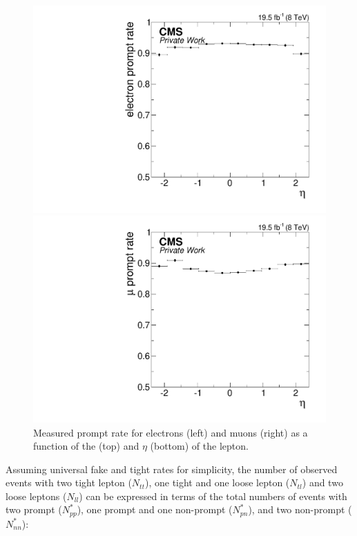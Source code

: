 \begin{figure}[htbp]
\begin{minipage}[t]{0.49\textwidth}
\includegraphics[width=\textwidth]{plots/BG/nonPrompt/promptRate_ele_Inclusive_Full2012_TrailingEta_None.pdf}
\end{minipage}
\begin{minipage}[t]{0.49\textwidth}
\includegraphics[width=\textwidth]{plots/BG/nonPrompt/promptRate_mu_Inclusive_Full2012_TrailingEta_None.pdf}
\end{minipage}
\caption{Measured prompt rate for electrons (left) and muons (right) as a function of the \pt (top) and $\eta$ (bottom) of the lepton.}


\label{fig:promptRate}
\end{figure} 
Assuming universal fake and tight rates for simplicity, the number of observed events with two tight lepton ($N_{tt}$), one tight and one loose lepton ($N_{tl}$) and two loose leptons ($N_{ll}$) can be expressed in terms of the total numbers of events with two prompt ($N_{pp}^{*}$), one prompt and one non-prompt ($N_{pn}^{*}$), and two non-prompt ($N_{nn}^{*}$): 
